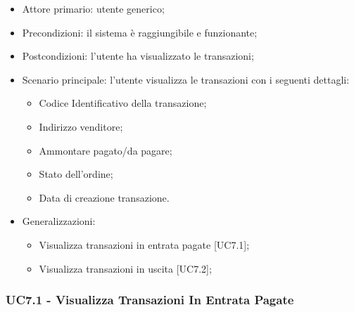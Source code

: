 \begin{itemize}
    \item Attore primario: utente generico;
    \item Precondizioni: il sistema è raggiungibile e funzionante;
    \item Postcondizioni: l'utente ha visualizzato le transazioni;
    \item Scenario principale: l'utente visualizza le transazioni con i seguenti dettagli:
        \begin{itemize}
            \item Codice Identificativo della transazione;
            \item Indirizzo venditore;
            \item Ammontare pagato/da pagare;
            \item Stato dell'ordine;
            \item Data di creazione transazione.
        \end{itemize}
    \item Generalizzazioni:
          \begin{itemize}
              \item Visualizza transazioni in entrata pagate [UC7.1];
              \item Visualizza transazioni in uscita [UC7.2];
          \end{itemize}
\end{itemize}

\subsubsection{UC7.1 - Visualizza Transazioni In Entrata Pagate}

